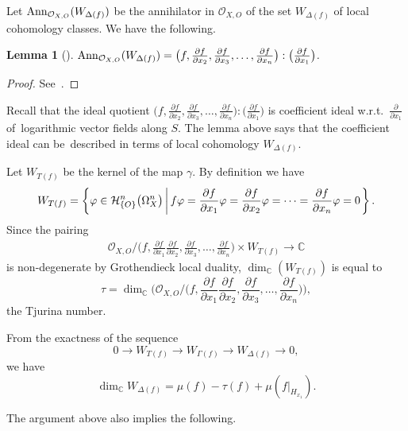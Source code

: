 \documentclass[10pt,a4paper]{amsart}
\numberwithin{equation}{section}
\newtheorem{Lemma}[Theorem]{Lemma}
\newcommand{\Set}[1]{\left\{#1\right\}}
\newcommand{\setDef}[2]{{#1}\left|\,\vphantom{#1}{#2}\right.}%
\newcommand{\SetDef}[2]{\Set{\setDef{#1}{#2}}}
\begin{document}
Let $ {\rm Ann}_{{\mathcal O}_{X,O}}(W_{\Delta(f)}) $ be the annihilator in $ {\mathcal O}_{X,O} $ of the set $ W_{\Delta(f)} $ of local cohomology classes.
We have the following.

\begin{Lemma}[\cite{T}]
${\rm Ann}_{{\mathcal O}_{X,O}}(W_{\Delta(f)}) = \big(f, \frac{\partial f}{\partial x_2},
\frac{\partial f}{\partial x_3},\ldots,
\frac{\partial f}{\partial x_{n}}\big) : \big(\frac{\partial f}{\partial x_1}\big)$.
\end{Lemma}

\begin{proof}
See~\cite{NT16a,T,TNN}.
\end{proof}

Recall that the ideal quotient $\big(f, \frac{\partial f}{\partial x_2}, \frac{\partial f}{\partial x_3},\ldots,\frac{\partial f}{\partial x_{n}}\big) : \big(\frac{\partial f}{\partial x_1}\big)$ is coefficient ideal w.r.t.~$\frac{\partial}{\partial x_1} $ of~loga\-rithmic vector fields along $S$. The lemma above says that the coefficient ideal can be~described in terms of local cohomology $ W_{\Delta(f)}$.

Let $W_{T(f)}$ be the kernel of the map $\gamma$. By definition we have
\[
W_{T(f)} = \SetDef{\varphi \in {\mathcal H}_{\{O\}}^n\big(\Omega_X^n\big)}{f\varphi = \frac{\partial f}{\partial x_1}\varphi = \frac{\partial f}{\partial x_2}\varphi = \cdots = \frac{\partial f}{\partial x_{n}}\varphi = 0}.
\]
Since the pairing
\begin{gather*}
\displaystyle{\mathcal O}_{X,O}\Big/\!\bigg(f, \frac{\partial f}{\partial x_1} \frac{\partial f}{\partial x_2}, \frac{\partial f}{\partial x_3},\ldots,\frac{\partial f}{\partial x_{n}}\bigg) \times W_{T(f)} \longrightarrow {\mathbb C}
\end{gather*}
is non-degenerate by Grothendieck local duality,
$ \dim_{{\mathbb C}}(W_{T(f)}) $ is equal to
\[
\tau = \dim_{{\mathbb C}}\bigg( {\mathcal O}_{X,O}\Big/\!\bigg(f, \frac{\partial f}{\partial x_1} \frac{\partial f}{\partial x_2}, \frac{\partial f}{\partial x_3},\ldots,\frac{\partial f}{\partial x_{n}}\bigg)\bigg),
\]
the Tjurina number.

From the exactness of the sequence
\[
0 \longrightarrow W_{T(f)} \longrightarrow W_{\Gamma(f)} \longrightarrow W_{\Delta(f)} \longrightarrow 0,
\]
we have
\[
\dim_{{\mathbb C}}W_{\Delta(f)} = \mu(f) - \tau(f) + \mu(f|_{H_{x_1}}).
\]


The argument above also implies the following.
\end{document}
